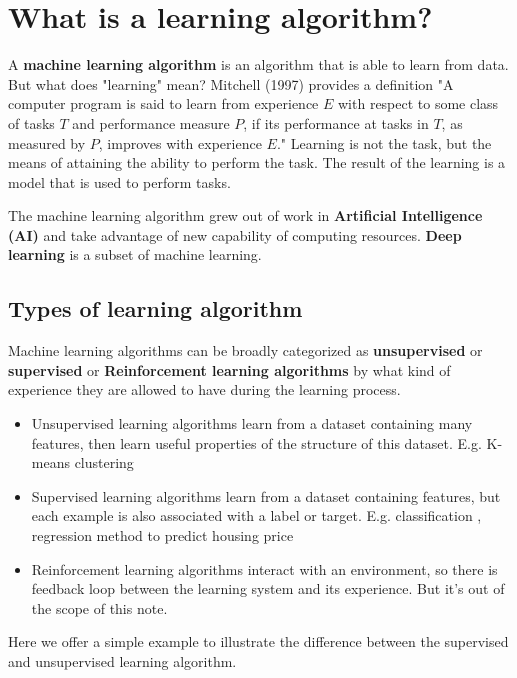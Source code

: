 \section{What is a learning algorithm?} 

        A \textbf{machine learning algorithm} is an algorithm that is able to learn from data. But what does "learning" mean? Mitchell (1997) provides a definition "A computer program is said to learn from experience $E$ with respect to some class of tasks	$T$	and performance measure	$P$, if its performance at tasks in	$T$, as measured by $P$, improves with experience $E$." Learning is not the task, but the means of attaining the ability to perform the task. The result of the learning is a model that is used to perform tasks.

        The machine learning algorithm grew out of work in \textbf{Artificial Intelligence (AI)} and take advantage of new capability of computing resources. \textbf{Deep learning} is a subset of machine learning.

    \subsection{Types of learning algorithm}

         Machine learning algorithms can be broadly categorized as \textbf{unsupervised} or \textbf{supervised} or \textbf{Reinforcement learning algorithms
         }	by what kind of experience they are allowed to have during the learning process. 
    \begin{itemize}		
        \item Unsupervised learning algorithms learn from a dataset containing many features, then learn useful properties of the structure of this dataset. E.g. K-means clustering	
        \item Supervised learning algorithms learn from a dataset containing features, but each example is also associated with a label or target. E.g. classification , regression method to predict housing price	
        \item Reinforcement learning algorithms interact with an environment, so there is feedback loop between the learning system and its experience. But it's out of the scope of this note.		
    \end{itemize}	
    Here we offer a simple example to illustrate the difference between the supervised and unsupervised learning algorithm.

